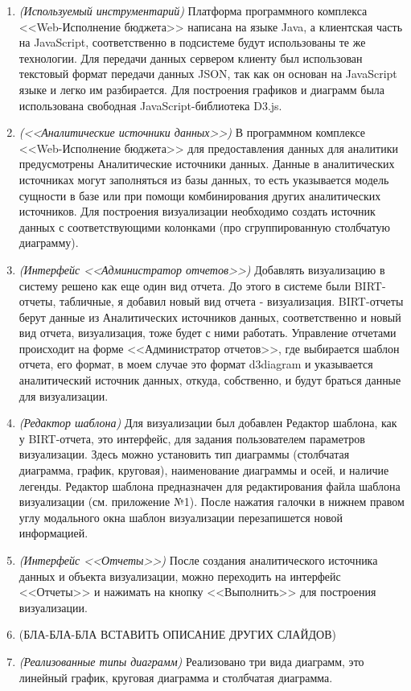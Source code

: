 \documentclass[a4paper]{extarticle}
\begin{document}
\begin{enumerate}[label=\textbf{\arabic*})]
\begin{itemize}
        \end{itemize}
    \item \textit{(Используемый инструментарий)} Платформа программного комплекса <<Web-Исполнение бюджета>> написана на языке Java, а клиентская часть на JavaScript, соответственно в подсистеме будут использованы те же технологии. Для передачи данных сервером клиенту был использован текстовый формат передачи данных JSON, так как он основан на JavaScript языке и легко им разбирается. Для построения графиков и диаграмм была использована свободная JavaScript-библиотека D3.js.
    \item \textit{(<<Аналитические источники данных>>)} В программном комплексе <<Web-\-Исполнение бюджета>> для предоставления данных для аналитики предусмотрены Аналитические источники данных. Данные в аналитических источниках могут заполняться из базы данных, то есть указывается модель сущности в базе или при помощи комбинирования других аналитических источников. Для построения визуализации необходимо создать источник данных с соответствующими колонками (про сгруппированную столбчатую диаграмму).
    \item \textit{(Интерфейс <<Администратор отчетов>>)} Добавлять визуализацию в систему решено как еще один вид отчета. До этого в системе были BIRT-отчеты, табличные, я добавил новый вид отчета - визуализация. BIRT-отчеты берут данные из Аналитических источников данных, соответственно и новый вид отчета, визуализация, тоже будет с ними работать. Управление отчетами происходит на форме <<Администратор отчетов>>, где выбирается шаблон отчета, его формат, в моем случае это формат d3diagram и указывается аналитический источник данных, откуда, собственно, и будут браться данные для визуализации.
	\item \textit{(Редактор шаблона)} Для визуализации был добавлен Редактор шаблона, как у BIRT-отчета, это интерфейс, для задания пользователем параметров визуализации. Здесь можно установить тип диаграммы (столбчатая диаграмма, график, круговая), наименование диаграммы и осей, и наличие легенды. Редактор шаблона предназначен для редактирования файла шаблона визуализации (см. приложение №1). После нажатия галочки в нижнем правом углу модального окна шаблон визуализации перезапишется новой информацией.
    \item \textit{(Интерфейс <<Отчеты>>)} После создания аналитического источника данных и объекта визуализации, можно переходить на интерфейс <<Отчеты>> и нажимать на кнопку <<Выполнить>> для построения визуализации.
	\item (БЛА-БЛА-БЛА ВСТАВИТЬ ОПИСАНИЕ ДРУГИХ СЛАЙДОВ)
	\item \textit{(Реализованные типы диаграмм)} Реализовано три вида диаграмм, это линейный график, круговая диаграмма и столбчатая диаграмма.
\end{enumerate}
\end{document}
